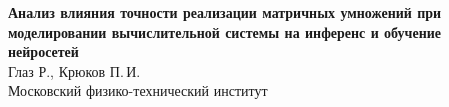 \thispagestyle{empty}
\renewcommand{\headrulewidth}{0pt}
\fancyhead[L]{}\fancyhead[R]{}\fancyhead[C]{}
\fancyfoot[C]{\thepage}

\begin{center}
    {\large\textbf{Анализ влияния точности реализации матричных умножений
            при моделировании вычислительной системы на инференс и обучение
            нейросетей}}\\[0.6em]

    {\normalsize Глаз Р., Крюков П.\,И.}\\[0.2em]
    {\small Московский физико-технический институт}
\end{center}

\vspace{0.4em}
